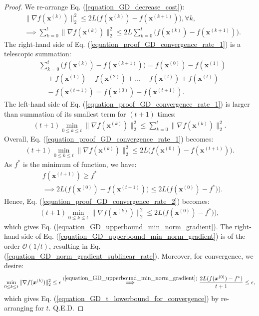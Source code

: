 \documentclass[lang=cn,10pt]{gorgeousnbook}
\numberwithin{equation}{section}%
\numberwithin{figure}{section}%
\begin{document}
\begin{proof}
We re-arrange Eq. (\ref{equation_GD_decrease_cost}):
\begin{align}
&\|\nabla f(\boldsymbol{x}^{(k)})\|_2^2 \leq 2L \big(f(\boldsymbol{x}^{(k)}) - f(\boldsymbol{x}^{(k+1)})\big), \forall k, \nonumber \\
&\implies \sum_{k=0}^t \|\nabla f(\boldsymbol{x}^{(k)})\|_2^2 \leq 2L \sum_{k=0}^t \big(f(\boldsymbol{x}^{(k)}) - f(\boldsymbol{x}^{(k+1)})\big). \label{equation_proof_GD_convergence_rate_1}
\end{align}
The right-hand side of Eq. (\ref{equation_proof_GD_convergence_rate_1}) is a telescopic summation:
\begin{align*}
&\sum_{k=0}^t \big(f(\boldsymbol{x}^{(k)}) - f(\boldsymbol{x}^{(k+1)})\big) = f(\boldsymbol{x}^{(0)}) - f(\boldsymbol{x}^{(1)}) \\
&~~~~~+ f(\boldsymbol{x}^{(1)}) - f(\boldsymbol{x}^{(2)}) + \dots - f(\boldsymbol{x}^{(t)}) + f(\boldsymbol{x}^{(t)}) \\
&~~~~~- f(\boldsymbol{x}^{(t+1)}) = f(\boldsymbol{x}^{(0)}) - f(\boldsymbol{x}^{(t+1)}).
\end{align*}
The left-hand side of Eq. (\ref{equation_proof_GD_convergence_rate_1}) is larger than summation of its smallest term for $(t+1)$ times:
\begin{align*}
(t+1) \min_{0\leq k \leq t} \|\nabla f(\boldsymbol{x}^{(k)})\|_2^2 \leq \sum_{k=0}^t \|\nabla f(\boldsymbol{x}^{(k)})\|_2^2.
\end{align*}
Overall, Eq. (\ref{equation_proof_GD_convergence_rate_1}) becomes:
\begin{align}\label{equation_proof_GD_convergence_rate_2}
(t+1) \min_{0\leq k \leq t} \|\nabla f(\boldsymbol{x}^{(k)})\|_2^2 \leq 2L \big( f(\boldsymbol{x}^{(0)}) - f(\boldsymbol{x}^{(t+1)}) \big).
\end{align}
As $f^*$ is the minimum of function, we have:
\begin{align*}
&f(\boldsymbol{x}^{(t+1)}) \geq f^* \\
&\implies
2L \big( f(\boldsymbol{x}^{(0)}) - f(\boldsymbol{x}^{(t+1)}) \big) \leq 2L \big( f(\boldsymbol{x}^{(0)}) - f^*) \big).
\end{align*}
Hence, Eq. (\ref{equation_proof_GD_convergence_rate_2}) becomes:
\begin{align*}
(t+1) \min_{0\leq k \leq t} \|\nabla f(\boldsymbol{x}^{(k)})\|_2^2 \leq 2L \big( f(\boldsymbol{x}^{(0)}) - f^*) \big),
\end{align*}
which gives Eq. (\ref{equation_GD_upperbound_min_norm_gradient}). The right-hand side of Eq. (\ref{equation_GD_upperbound_min_norm_gradient}) is of the order $\mathcal{O}(1/t)$, resulting in Eq. (\ref{equation_GD_norm_gradient_sublinear_rate}). 
Moreover, for convergence, we desire:
\begin{align*}
\min_{0\leq k \leq t} \|\nabla f(\boldsymbol{x}^{(k)})\|_2^2 \leq \epsilon \overset{(\ref{equation_GD_upperbound_min_norm_gradient})}{\implies} \frac{2 L (f(\boldsymbol{x}^{(0)}) - f^*)}{t+1} \leq \epsilon,
\end{align*}
which gives Eq. (\ref{equation_GD_t_lowerbound_for_convergence}) by re-arranging for $t$. Q.E.D.
\end{proof}
\end{document}
